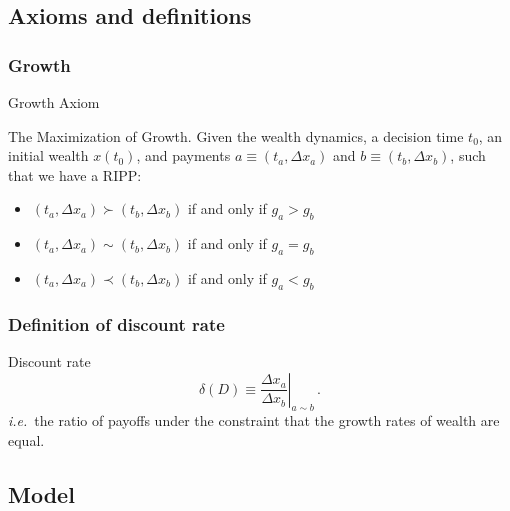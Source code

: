 \documentclass{beamer}
\newcommand{\ie}{{\it i.e.}\ }
\newcommand{\be}{\begin{equation}}
\newcommand{\ee}{\end{equation}}
\newcommand{\Dx}{\Delta x}
\newcommand{\del}{D}
\numberwithin{equation}{section}
\begin{document}
\subsection{Axioms and definitions}

\subsubsection{Growth}

\begin{frame}{Growth Axiom}
\begin{definition}{The Maximization of Growth.}
Given the wealth dynamics, a decision time $t_0$, an initial wealth $x\left(t_0\right)$, and payments $a\equiv\left(t_a,\Dx_a\right)$ and $b\equiv\left(t_b,\Dx_b\right)$, such that we have a RIPP:
\begin{itemize}
\item $\left(t_a,\Dx_a\right) \succ \left(t_b,\Dx_b\right)$ if and only if $g_a > g_b$
\item $\left(t_a,\Dx_a\right) \sim \left(t_b,\Dx_b\right)$ if and only if $g_a = g_b$
\item $\left(t_a,\Dx_a\right) \prec \left(t_b,\Dx_b\right)$ if and only if $g_a < g_b$
\end{itemize}
\label{ax:ax1}
\end{definition}
\end{frame}

\subsubsection{Definition of discount rate}
\begin{frame}{Discount rate}
\be
\delta\left(\del\right) \equiv \left.\frac{\Dx_a}{\Dx_b}\right|_{a \sim b}\,.
\ee
\ie the ratio of payoffs under the constraint that the growth rates of wealth are equal.
\end{frame}

\subsection{Model}
\end{document}
